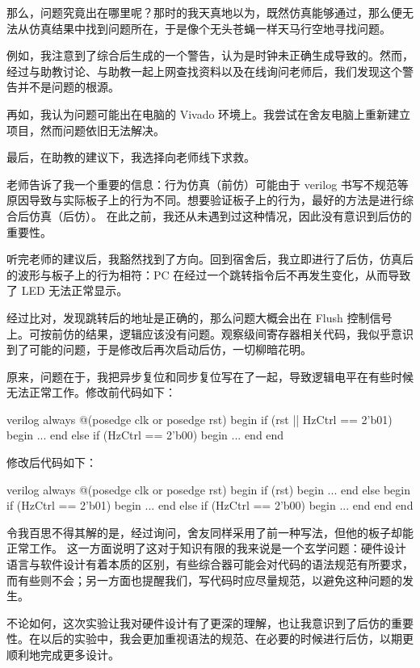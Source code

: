 \documentclass[a4paper]{article}  %
\begin{document}
那么，问题究竟出在哪里呢？那时的我天真地以为，既然仿真能够通过，那么便无法从仿真结果中找到问题所在，于是像个无头苍蝇一样天马行空地寻找问题。

例如，我注意到了综合后生成的一个警告，认为是时钟未正确生成导致的。然而，经过与助教讨论、与助教一起上网查找资料以及在线询问老师后，我们发现这个警告并不是问题的根源。

再如，我认为问题可能出在电脑的 Vivado 环境上。我尝试在舍友电脑上重新建立项目，然而问题依旧无法解决。

最后，在助教的建议下，我选择向老师线下求救。

老师告诉了我一个重要的信息：行为仿真（前仿）可能由于 verilog 书写不规范等原因导致与实际板子上的行为不同。想要验证板子上的行为，最好的方法是进行综合后仿真（后仿）。
在此之前，我还从未遇到过这种情况，因此没有意识到后仿的重要性。

听完老师的建议后，我豁然找到了方向。回到宿舍后，我立即进行了后仿，仿真后的波形与板子上的行为相符：PC 在经过一个跳转指令后不再发生变化，从而导致了 LED 无法正常显示。

经过比对，发现跳转后的地址是正确的，那么问题大概会出在 Flush 控制信号上。可按前仿的结果，逻辑应该没有问题。观察级间寄存器相关代码，我似乎意识到了可能的问题，于是修改后再次启动后仿，一切柳暗花明。

原来，问题在于，我把异步复位和同步复位写在了一起，导致逻辑电平在有些时候无法正常工作。修改前代码如下：

\begin{codeblock}{verilog}
always @(posedge clk or posedge rst) begin
    if (rst || HzCtrl == 2'b01) begin
        ... 
    end
    else if (HzCtrl == 2'b00) begin
        ...
    end
end
\end{codeblock}

修改后代码如下：

\begin{codeblock}{verilog}
always @(posedge clk or posedge rst) begin
    if (rst) begin
        ...
    end
    else begin
        if (HzCtrl == 2'b01) begin
            ...
        end
        else if (HzCtrl == 2'b00) begin
            ...
        end
    end
end
\end{codeblock}

令我百思不得其解的是，经过询问，舍友同样采用了前一种写法，但他的板子却能正常工作。
这一方面说明了这对于知识有限的我来说是一个玄学问题：硬件设计语言与软件设计有着本质的区别，有些综合器可能会对代码的语法规范有所要求，而有些则不会；另一方面也提醒我们，写代码时应尽量规范，以避免这种问题的发生。

不论如何，这次实验让我对硬件设计有了更深的理解，也让我意识到了后仿的重要性。在以后的实验中，我会更加重视语法的规范、在必要的时候进行后仿，以期更顺利地完成更多设计。
\end{document}
